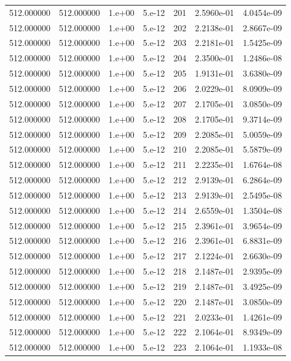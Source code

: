 \begin{table}[htbp]
\begin{tabular}{rrrrrrr}
512.000000 & 512.000000 & 1.e+00 & 5.e-12 & 201 & 2.5960e-01 & 4.0454e-09 \\
512.000000 & 512.000000 & 1.e+00 & 5.e-12 & 202 & 2.2138e-01 & 2.8667e-09 \\
512.000000 & 512.000000 & 1.e+00 & 5.e-12 & 203 & 2.2181e-01 & 1.5425e-09 \\
512.000000 & 512.000000 & 1.e+00 & 5.e-12 & 204 & 2.3500e-01 & 1.2486e-08 \\
512.000000 & 512.000000 & 1.e+00 & 5.e-12 & 205 & 1.9131e-01 & 3.6380e-09 \\
512.000000 & 512.000000 & 1.e+00 & 5.e-12 & 206 & 2.0229e-01 & 8.0909e-09 \\
512.000000 & 512.000000 & 1.e+00 & 5.e-12 & 207 & 2.1705e-01 & 3.0850e-09 \\
512.000000 & 512.000000 & 1.e+00 & 5.e-12 & 208 & 2.1705e-01 & 9.3714e-09 \\
512.000000 & 512.000000 & 1.e+00 & 5.e-12 & 209 & 2.2085e-01 & 5.0059e-09 \\
512.000000 & 512.000000 & 1.e+00 & 5.e-12 & 210 & 2.2085e-01 & 5.5879e-09 \\
512.000000 & 512.000000 & 1.e+00 & 5.e-12 & 211 & 2.2235e-01 & 1.6764e-08 \\
512.000000 & 512.000000 & 1.e+00 & 5.e-12 & 212 & 2.9139e-01 & 6.2864e-09 \\
512.000000 & 512.000000 & 1.e+00 & 5.e-12 & 213 & 2.9139e-01 & 2.5495e-08 \\
512.000000 & 512.000000 & 1.e+00 & 5.e-12 & 214 & 2.6559e-01 & 1.3504e-08 \\
512.000000 & 512.000000 & 1.e+00 & 5.e-12 & 215 & 2.3961e-01 & 3.9654e-09 \\
512.000000 & 512.000000 & 1.e+00 & 5.e-12 & 216 & 2.3961e-01 & 6.8831e-09 \\
512.000000 & 512.000000 & 1.e+00 & 5.e-12 & 217 & 2.1224e-01 & 2.6630e-09 \\
512.000000 & 512.000000 & 1.e+00 & 5.e-12 & 218 & 2.1487e-01 & 2.9395e-09 \\
512.000000 & 512.000000 & 1.e+00 & 5.e-12 & 219 & 2.1487e-01 & 3.4925e-09 \\
512.000000 & 512.000000 & 1.e+00 & 5.e-12 & 220 & 2.1487e-01 & 3.0850e-09 \\
512.000000 & 512.000000 & 1.e+00 & 5.e-12 & 221 & 2.0233e-01 & 1.4261e-09 \\
512.000000 & 512.000000 & 1.e+00 & 5.e-12 & 222 & 2.1064e-01 & 8.9349e-09 \\
512.000000 & 512.000000 & 1.e+00 & 5.e-12 & 223 & 2.1064e-01 & 1.1933e-08 \\

\end{tabular}
\end{table}
